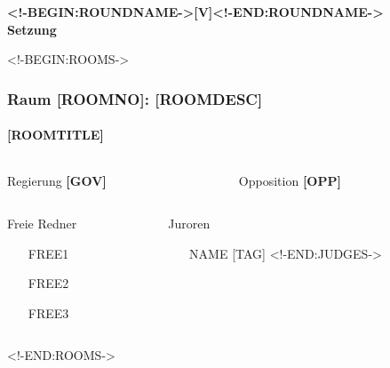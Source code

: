 \documentclass[german,12pt,t]{beamer}
\begin{document}
\begin{frame}
  \vfill
  \begin{center}
    \huge\bfseries{} <!-BEGIN:ROUNDNAME->[V]<!-END:ROUNDNAME->\\
    Setzung
  \end{center}  
  \vfill
\end{frame}



<!-BEGIN:ROOMS->
\begin{frame}[squeeze]
  \frametitle{Raum [ROOMNO]: [ROOMDESC]}
  \framesubtitle{[ROOMTITLE]}
  \vspace{-1.5em}
  \begin{columns}
    \begin{column}{0.5\linewidth}
      \begin{block}{\small Regierung}
        \centering
        \textbf{[GOV]}
      \end{block}
    \end{column}
    \begin{column}{0.5\linewidth}
      \begin{block}{\small Opposition}
        \centering
        \textbf{[OPP]}
      \end{block}
    \end{column}
  \end{columns}
  \vspace{0.5em}
  \begin{columns}
     \begin{column}{0.5\linewidth}
       \begin{block}{\small Freie Redner}
         \begin{enumerate}
         \item [FREE1]
         \item [FREE2]
         \item [FREE3]
         \end{enumerate}
       \end{block}
     \end{column}
     \begin{column}{0.5\linewidth}
       \begin{block}{\small Juroren}
         \begin{itemize}
           <!-BEGIN:JUDGES->
         \item [NAME] {\small [TAG]} 
           <!-END:JUDGES->
         \end{itemize}
       \end{block}
     \end{column}
   \end{columns}
\end{frame}
<!-END:ROOMS->
\end{document}
